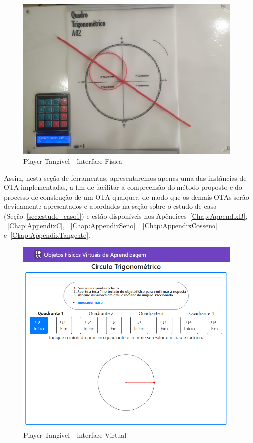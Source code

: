 \begin{figure}[htb]
	\centering
	\includegraphics[width=0.7\linewidth]{chapters/proposedMethod/tools/OFVA_quadrotrigonometrico.jpeg}
	\caption{Player Tangível - Interface Física}
	\label{fig:ofva_quadrotrigonometrico}
\end{figure}

Assim, nesta seção de ferramentas, apresentaremos apenas uma das instâncias de OTA implementadas, a fim de facilitar a compreensão do método proposto e do processo de construção de um OTA qualquer, de modo que os demais OTAs serão devidamente apresentados e abordados na seção sobre o estudo de caso (Seção~\ref{sec:estudo_caso1}) e estão disponíveis nos Apêndices~\ref{Chap:AppendixB}, ~\ref{Chap:AppendixC}, ~\ref{Chap:AppendixSeno}, ~\ref{Chap:AppendixCosseno} e~\ref{Chap:AppendixTangente}.

\begin{figure}[htb]
	\centering
	\includegraphics[width=0.7\linewidth]{chapters/proposedMethod/tools/OFVA_VIRTUAL.png}
	\caption{Player Tangível - Interface Virtual}
	\label{fig:ofva_virtual}
\end{figure}

